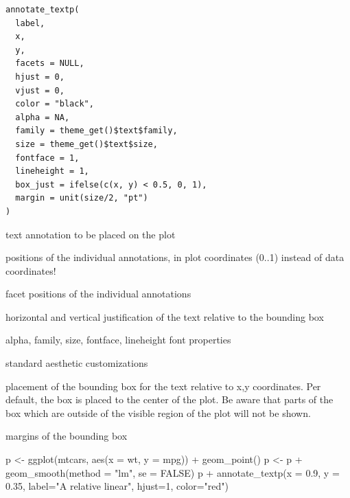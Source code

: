 \documentclass[a4paper]{book}
\begin{document}
%
\begin{Usage}
\begin{verbatim}
annotate_textp(
  label,
  x,
  y,
  facets = NULL,
  hjust = 0,
  vjust = 0,
  color = "black",
  alpha = NA,
  family = theme_get()$text$family,
  size = theme_get()$text$size,
  fontface = 1,
  lineheight = 1,
  box_just = ifelse(c(x, y) < 0.5, 0, 1),
  margin = unit(size/2, "pt")
)
\end{verbatim}
\end{Usage}
%
\begin{Arguments}
\begin{ldescription}
\item[\code{label}] text annotation to be placed on the plot

\item[\code{x}, \code{y}] positions of the individual annotations, in plot coordinates
(0..1) instead of data coordinates!

\item[\code{facets}] facet positions of the individual annotations

\item[\code{hjust}, \code{vjust}] horizontal and vertical justification of the text relative
to the bounding box

\item[\code{color}] alpha, family, size, fontface, lineheight font properties

\item[\code{alpha}, \code{family}, \code{size}, \code{fontface}, \code{lineheight}] standard aesthetic customizations

\item[\code{box\_just}] placement of the bounding box for the text relative to x,y
coordinates. Per default, the box is placed to the center of the plot. Be
aware that parts of the box which are outside of the visible region of the
plot will not be shown.

\item[\code{margin}] margins of the bounding box
\end{ldescription}
\end{Arguments}
%
\begin{Examples}
\begin{ExampleCode}
p <- ggplot(mtcars, aes(x = wt, y = mpg)) + geom_point()
p <- p + geom_smooth(method = "lm", se = FALSE)
p + annotate_textp(x = 0.9, y = 0.35, label="A relative linear\nrelationship", hjust=1, color="red")
\end{ExampleCode}
\end{Examples}
\end{document}
